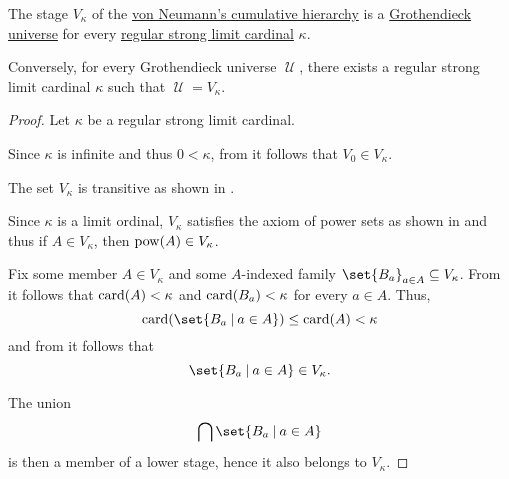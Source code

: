 \begin{theorem}\label{thm:grothendieck_universe_iff_regular_strong_limit}
  The stage \( V_\kappa \) of the \hyperref[def:cumulative_hierarchy]{von Neumann's cumulative hierarchy} is a \hyperref[def:grothendieck_universe]{Grothendieck universe} for every \hyperref[rem:strongly_inaccessible_cardinal]{regular strong limit cardinal} \( \kappa \).

  Conversely, for every Grothendieck universe \( \mscrU \), there exists a regular strong limit cardinal \( \kappa \) such that \( \mscrU = V_\kappa \).
\end{theorem}
\begin{proof}
  \SufficiencySubProof Let \( \kappa \) be a regular strong limit cardinal.

   Since \( \kappa \) is infinite and thus \( 0 < \kappa \), from  it follows that \( V_0 \in V_\kappa \).

   The set \( V_\kappa \) is transitive as shown in .

   Since \( \kappa \) is a limit ordinal, \( V_\kappa \) satisfies the axiom of power sets as shown in  and thus if \( A \in V_\kappa \), then \( \operatorname{pow}(A) \in V_\kappa \).

   Fix some member \( A \in V_\kappa \) and some \( A \)-indexed family \( \set{ B_a }_{a \in A} \subseteq V_\kappa \). From  it follows that \( \operatorname{card}(A) < \kappa \) and \( \operatorname{card}(B_a) < \kappa \) for every \( a \in A \). Thus,
  \begin{equation*}
    \card(\set{ B_a \given a \in A }) \leq \card(A) < \kappa
  \end{equation*}
  and from  it follows that
  \begin{equation*}
    \set{ B_a \given a \in A } \in V_\kappa.
  \end{equation*}

  The union
  \begin{equation*}
    \bigcap \set{ B_a \given a \in A }
  \end{equation*}
  is then a member of a lower stage, hence it also belongs to \( V_\kappa \).


\end{proof}
